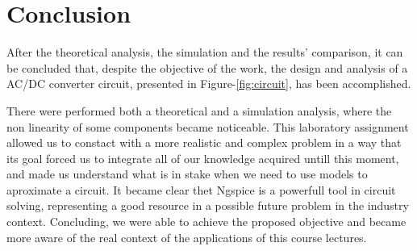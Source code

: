 \section{Conclusion}
\label{sec:conclusion}

After the theoretical analysis, the simulation and the results' comparison, it can be
concluded that, despite the objective of the work, the design and analysis of a AC/DC converter
circuit, presented in Figure-\ref{fig:circuit}, has been accomplished.\par

There were performed both a theoretical and a simulation analysis, where the non linearity of some components became noticeable. This laboratory assignment allowed us to constact with a more realistic and complex problem in a way that its goal forced us to integrate all of our knowledge acquired untill this moment, and made us understand what is in stake when we need to use models to aproximate a circuit.
It became clear thet Ngspice is a powerfull tool in circuit solving, representing a good resource in a possible future problem in the industry context.
Concluding, we were able to achieve the proposed objective and became more aware of the real context of the applications of this course lectures.



